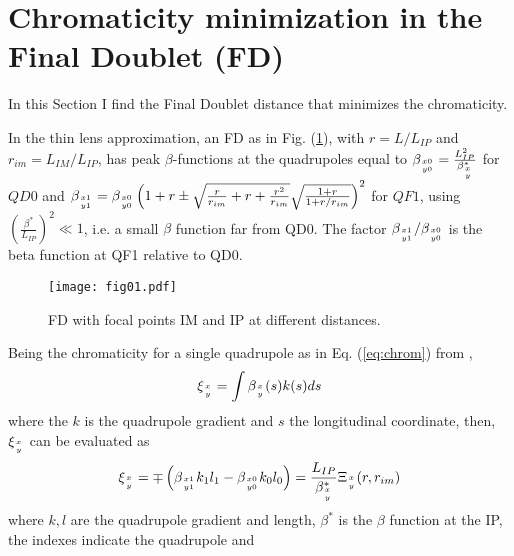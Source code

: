\section{Chromaticity minimization in the Final Doublet (FD)}
In this Section I find the Final Doublet distance that minimizes the chromaticity.\par 
In the thin lens approximation, an FD as in Fig. (\ref{f:FDchrom}),  with $r=L/L_{IP}$ and $r_{im}=L_{IM}/L_{IP}$, has peak $\beta$-functions at the quadrupoles equal to $\beta_{x0\atop y0}=\frac{L^2_{IP}}{\beta^*_{x\atop y}}$  for $QD0$ and $
\beta_{x1\atop y1}=\beta_{x0\atop y0}\left(1+r\pm\sqrt{\frac{r}{r_{im}}+r+\frac{r^2}{r_{im}}}\sqrt{\frac{1+r}{1+r/r_{im}}}\right)^2
$ for $QF1$, using $\left(\frac{\beta^*}{L_{IP}}\right)^2\ll1$, i.e. a small $\beta$ function far from QD0. The factor $\beta_{x1\atop y1}/\beta_{x0\atop y0}$ is the beta function at QF1 relative to QD0.\par
\begin{figure}[!htb]
 \centering
 \texttt{[image: fig01.pdf]}\caption{FD with focal points IM and IP at different distances.}\label{f:FDchrom}
 \end{figure}
Being the chromaticity for a single quadrupole as in Eq. (\ref{eq:chrom}) from \cite{GarciaMorales:1982827}, 
\begin{equation}
\xi_{x\atop y}=\int\beta_{x\atop y}(s)k(s)ds\label{eq:chrom}
\end{equation}
where the $k$ is the quadrupole gradient and $s$ the longitudinal coordinate, then, $\xi_{x\atop y}$ can be evaluated as
\begin{equation}
 \xi_{x\atop y}=\mp\left(\beta_{x1\atop y1}k_1l_1-\beta_{x0\atop y0}k_0l_0\right)=\frac{L_{IP}}{\beta^*_{x\atop y}}\Xi_{x\atop y}(r,r_{im})
\end{equation}
where $k,l$ are the quadrupole gradient and length, $\beta^*$ is the $\beta$ function at the IP, the indexes indicate the quadrupole and 

